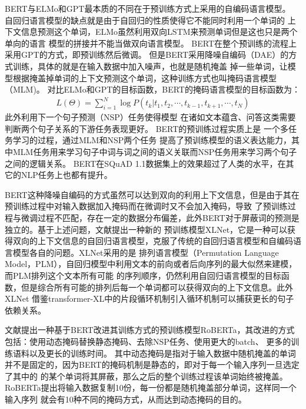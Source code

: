 BERT与ELMo和GPT最本质的不同在于预训练方式上采用的自编码语言模型。
自回归语言模型的缺点就是由于自回归的性质使得它不能同时利用一个单词的
上下文信息预测这个单词，ELMo虽然利用双向LSTM来预测单词但是这也只是两个单向的语言
模型的拼接并不能当做双向语言模型。
BERT在整个预训练的流程上采用GPT的方式，即预训练然后微调。
但是BERT采用降噪自编码（DAE）的方式训练，具体的就是在输入数据中加入噪声，也就是随机掩盖
掉一些单词，让模型根据掩盖掉单词的上下文预测这个单词，这种训练方式也叫掩码语言模型（MLM)。
对比ELMo和GPT的目标函数，BERT的掩码语言模型的目标函数为：
\begin{equation}
    \begin{split}
        L(\Theta)=\sum_{i=1}^{N}\log P(t_k|t_1,t_2,\cdots,t_{k-1},t_{k+1},\cdots,t_{N})
    \end{split}
\end{equation}
此外利用下一个句子预测（NSP）任务使得模型
在诸如文本蕴含、问答这类需要判断两个句子关系的下游任务表现更好。
BERT的预训练过程实质上是
一个多任务学习的过程，通过MLM和NSP两个任务
提高了预训练模型的语义表达能力，其中MLM任务用来学习句子中词与词之间的语义关联而NSP任务用来学习两个句子之间的逻辑关系。
BERT在SQuAD 1.1数据集上的效果超过了人类的水平，在其它的NLP任务上也都有提升。

BERT这种降噪自编码的方式虽然可以达到双向的利用上下文信息，但是由于其在预训练过程中对输入数据加入掩码而在微调时又不会加入掩码，导致
了预训练过程与微调过程不匹配，存在一定的数据分布偏差，此外BERT对于屏蔽词的预测是独立的。基于上述问题，文献\cite{XLNet}提出一种新的
预训练模型XLNet，它是一种可以获得双向的上下文信息的自回归语言模型，克服了传统的自回归语言模型和自编码语言模型各自的问题。XLNet采用的是
排列语言模型（Permutation Language Model，PLM），自回归模型中利用文本的前向或者后向序列的最大似然来建模，而PLM排列这个文本所有可能
的序列顺序，仍然利用自回归语言模型的目标函数，但是综合所有可能的排列后每一个单词都可以获得双向的上下文信息。此外XLNet
借鉴transformer-XL中的片段循环机制引入循环机制可以捕获更长的句子依赖关系。

文献\cite{RoBERTa}提出一种基于BERT改进其训练方式的预训练模型RoBERTa，其改进的方式包括：使用动态掩码替换静态掩码、去除NSP任务、使用更大的batch、
更多的训练语料以及更长的训练时间。
其中动态掩码是指对于输入数据中随机掩盖的单词并不是固定的，因为BERT的掩码机制是静态的，即对于每一个输入序列一旦选定了其中的
的某个单词将其屏蔽，那么之后的整个训练过程该单词始终被掩盖。RoBERTa提出将输入数据复制10份，每一份都是随机掩盖部分单词，这样同一个输入序列
就会有10种不同的掩码方式，从而达到动态掩码的目的。








